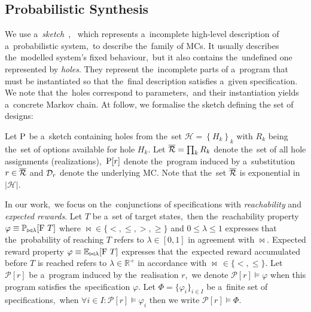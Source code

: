 \subsection{Probabilistic Synthesis}
We use a~\textit{sketch}~\cite{sketching1,sygus}, ~which represents a~incomplete high-level description of a~probabilistic system,~to describe the~family of MCs.
It usually describes the~modelled system's fixed behaviour,~but it also contains the~undefined one represented by \textit{holes}.
They represent the~incomplete parts of a~program that must be instantiated so that the~final description satisfies a~given specification.
We note that the~holes correspond to parameters,~and their instantiation yields a~concrete Markov chain.
At follow, we formalise the sketch defining the set of designs:

\begin{definition}[Sketch]
Let $\mathrm{P}$ be a~sketch containing holes from the~set $\mathcal{H} = \left\{ H_k \right \}_k$ with $R_k$ being the~set of options available for hole $H_k$.
Let $\overline{\mathcal{R}} = \prod_k R_k$ denote the~set of all hole assignments (realizations),~$\mathrm{P}[r]$ denote the~program induced by a~substitution $r \in \overline{\mathcal{R}}$ and $\mathcal{D}_r$ denote the underlying MC.
Note that the~set $\overline{\mathcal{R}}$ is exponential in $\lvert \mathcal{H} \rvert$.
\end{definition}


\begin{definition}[Specification]
In our work,~we focus on the~conjunctions of specifications with \textit{reachability} and \textit{expected rewards}.
Let $T$ be a~set of target states,~then the~reachability property $\varphi \equiv \mathbb{P}_{\bowtie \lambda}[\mathrm{F}\ T]$ where $\bowtie \in \{<, \leq, >, \geq\}$ and $0 \leq \lambda \leq 1$ expresses that the~probability of reaching $T$ refers to $\lambda \in [0,1]$ in agreement with $\bowtie$.
Expected reward property $\varphi \equiv \mathbb{E}_{\bowtie \lambda}[\mathrm{F}\ T]$ expresses that the~expected reward accumulated before $T$ is reached refers to $\lambda \in \mathbb{R}^+$ in accordance with $\bowtie \, \in \{<, \leq \}$.
Let $\mathcal{P}[r]$ be a~program induced by the~realisation $r$,~we denote $\mathcal{P}[r] \models \varphi$ when this program satisfies the~specification $\varphi$.
Let $\varPhi = \{ \varphi_i \}_{i \in I}$ be a~finite set of specifications,~when $\forall i \in I: \mathcal{P}[r] \models \varphi_i$ then we write $\mathcal{P}[r] \models \varPhi$.
\end{definition}

